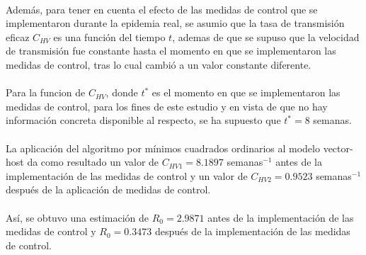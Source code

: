 			\\
			Además, para tener en cuenta el efecto de las medidas de control que se implementaron durante la epidemia real, se asumio que la tasa de transmisión eficaz $C_{HV}$ es una función del tiempo $t$, ademas de que se supuso que la velocidad de transmisión fue constante hasta el momento en que se implementaron las medidas de control, tras lo cual cambió a un valor constante diferente.\\
			\\
			Para la funcion de $C_{HV}$, donde $t^*$ es el momento en que se implementaron las medidas de control, para los fines de este estudio y en vista de que no hay información concreta disponible al respecto, se ha supuesto que $t^* = 8$ semanas.\\
			\\
			La aplicación del algoritmo por mínimos cuadrados ordinarios al modelo vector-host da como resultado un valor de $C_{HV1} = 8.1897$ semanas$^{-1}$ antes de la implementación de las medidas de control y un valor de $C_{HV2} = 0.9523$ semanas$^{-1}$ después de la aplicación de medidas de control.\\
			\\
			Así, se obtuvo una estimación de $R_0 = 2.9871$ antes de la implementación de las medidas de control y $R_0 = 0.3473$ después de la implementación de las medidas de control.\\	
	
